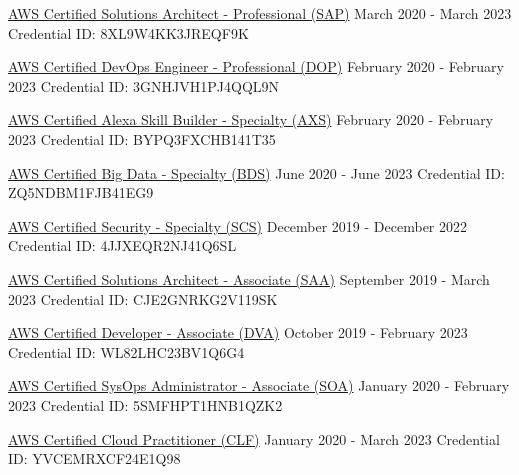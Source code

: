 \documentclass[letterpaper]{awesome-cv}
\begin{document}
\begin{cventries}
  \cventry
    {
      \href{https://www.youracclaim.com/badges/03730776-b911-43ac-8d3a-99f3f4513162/public_url}{AWS Certified Solutions Architect - Professional (SAP)}
    }
    {March 2020 - March 2023}
    {Credential ID: 8XL9W4KK3JREQF9K}
    {}
    {}

  \cventry
    {
      \href{https://www.youracclaim.com/badges/d0c32f27-054b-432c-9fd1-8d3e912a9396/public_url}{AWS Certified DevOps Engineer - Professional (DOP)}
    }
    {February 2020 - February 2023}
    {Credential ID: 3GNHJVH1PJ4QQL9N}
    {}
    {}

  \cventry
    {
      \href{https://www.youracclaim.com/badges/b908a72e-7d86-41f1-9715-d8a035f07b70/public_url}{AWS Certified Alexa Skill Builder - Specialty (AXS)}
    }
    {February 2020 - February 2023}
    {Credential ID: BYPQ3FXCHB141T35}
    {}
    {}

  \cventry
    {
      \href{https://www.youracclaim.com/badges/8e12bd33-2fa9-4ea9-bc06-b6a34cba1ca1/public_url}{AWS Certified Big Data - Specialty (BDS)}
    }
    {June 2020 - June 2023}
    {Credential ID: ZQ5NDBM1FJB41EG9}
    {}
    {}

  \cventry
    {
      \href{https://www.youracclaim.com/badges/33206a04-66c4-41df-877b-db34ffcb93a8/public_url}{AWS Certified Security - Specialty (SCS)}
    }
    {December 2019 - December 2022}
    {Credential ID: 4JJXEQR2NJ41Q6SL}
    {}
    {}

  \cventry
    {
      \href{https://www.youracclaim.com/badges/b0cd52af-b58f-44ff-aa19-b189ce841629/public_url}{AWS Certified Solutions Architect - Associate (SAA)}
    }
    {September 2019 - March 2023}
    {Credential ID: CJE2GNRKG2V119SK}
    {}
    {}

  \cventry
    {
      \href{https://www.youracclaim.com/badges/afffcfaa-b3d0-4d2b-8d3e-71c281150763/public_url}{AWS Certified Developer - Associate (DVA)}
    }
    {October 2019 - February 2023}
    {Credential ID: WL82LHC23BV1Q6G4}
    {}
    {}

  \cventry
    {
      \href{https://www.youracclaim.com/badges/b3409740-de23-4249-939b-81abe72624cb/public_url}{AWS Certified SysOps Administrator - Associate (SOA)}
    }
    {January 2020 - February 2023}
    {Credential ID: 5SMFHPT1HNB1QZK2}
    {}
    {}

  \cventry
    {
      \href{https://www.youracclaim.com/badges/d8fc811b-6cda-46d0-a1b1-1aee5e390dd1/public_url}{AWS Certified Cloud Practitioner (CLF)}
    }
    {January 2020 - March 2023}
    {Credential ID: YVCEMRXCF24E1Q98}
    {}
    {}

\end{cventries}
\end{document}
